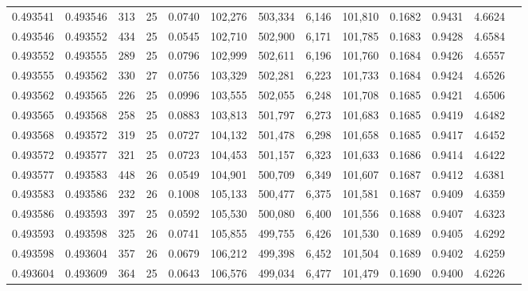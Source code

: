 \begin{tabular}{rrrrrrrrrrrrr}
0.493541 & 0.493546 & 313 &  25 &                                     0.0740 & 102,276 & 503,334 &   6,146 & 101,810 & 0.1682 & 0.9431 & 4.6624 \\
0.493546 & 0.493552 & 434 &  25 &                                     0.0545 & 102,710 & 502,900 &   6,171 & 101,785 & 0.1683 & 0.9428 & 4.6584 \\
0.493552 & 0.493555 & 289 &  25 &                                     0.0796 & 102,999 & 502,611 &   6,196 & 101,760 & 0.1684 & 0.9426 & 4.6557 \\
0.493555 & 0.493562 & 330 &  27 &                                     0.0756 & 103,329 & 502,281 &   6,223 & 101,733 & 0.1684 & 0.9424 & 4.6526 \\
0.493562 & 0.493565 & 226 &  25 &                                     0.0996 & 103,555 & 502,055 &   6,248 & 101,708 & 0.1685 & 0.9421 & 4.6506 \\
0.493565 & 0.493568 & 258 &  25 &                                     0.0883 & 103,813 & 501,797 &   6,273 & 101,683 & 0.1685 & 0.9419 & 4.6482 \\
0.493568 & 0.493572 & 319 &  25 &                                     0.0727 & 104,132 & 501,478 &   6,298 & 101,658 & 0.1685 & 0.9417 & 4.6452 \\
0.493572 & 0.493577 & 321 &  25 &                                     0.0723 & 104,453 & 501,157 &   6,323 & 101,633 & 0.1686 & 0.9414 & 4.6422 \\
0.493577 & 0.493583 & 448 &  26 &                                     0.0549 & 104,901 & 500,709 &   6,349 & 101,607 & 0.1687 & 0.9412 & 4.6381 \\
0.493583 & 0.493586 & 232 &  26 &                                     0.1008 & 105,133 & 500,477 &   6,375 & 101,581 & 0.1687 & 0.9409 & 4.6359 \\
0.493586 & 0.493593 & 397 &  25 &                                     0.0592 & 105,530 & 500,080 &   6,400 & 101,556 & 0.1688 & 0.9407 & 4.6323 \\
0.493593 & 0.493598 & 325 &  26 &                                     0.0741 & 105,855 & 499,755 &   6,426 & 101,530 & 0.1689 & 0.9405 & 4.6292 \\
0.493598 & 0.493604 & 357 &  26 &                                     0.0679 & 106,212 & 499,398 &   6,452 & 101,504 & 0.1689 & 0.9402 & 4.6259 \\
0.493604 & 0.493609 & 364 &  25 &                                     0.0643 & 106,576 & 499,034 &   6,477 & 101,479 & 0.1690 & 0.9400 & 4.6226 \\

\end{tabular}
